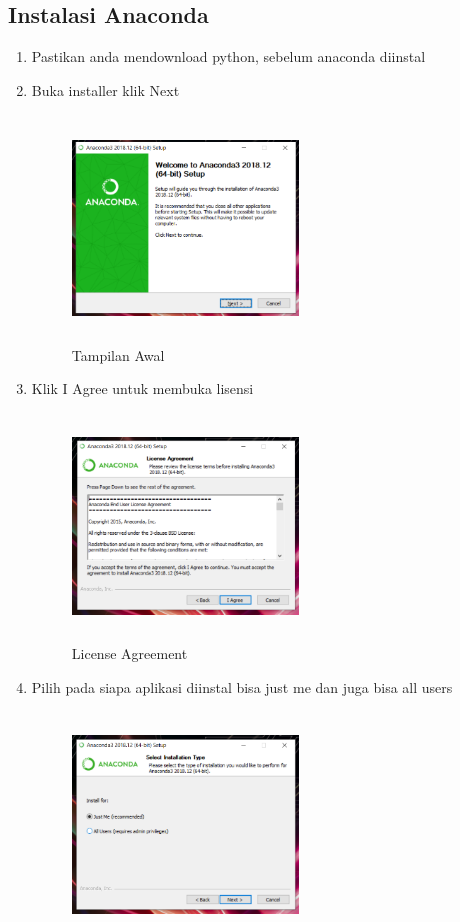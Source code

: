 \subsection{Instalasi Anaconda}
\begin{enumerate}
    \item Pastikan anda mendownload python, sebelum anaconda diinstal
    \item Buka installer klik Next
     \begin{figure}[!htbp]
        \centering
        \includegraphics[width=6cm,height=6cm]{figures/advent/1.png}
        \caption{Tampilan Awal}
        \label{awal}
        \end{figure}
    \item Klik I Agree untuk membuka lisensi
     \begin{figure}[!htbp]
        \centering
        \includegraphics[width=6cm,height=6cm]{figures/advent/2.png}
        \caption{License Agreement}
        \label{awal}
        \end{figure}
    \item  Pilih pada siapa aplikasi diinstal bisa just me dan juga bisa all users
     \begin{figure}[!htbp]
        \centering
        \includegraphics[width=6cm,height=6cm]{figures/advent/3.png}

\end{figure}
\end{enumerate}
